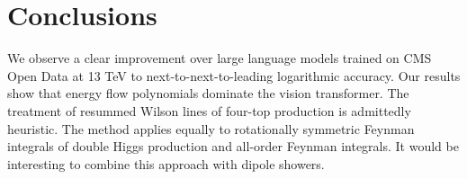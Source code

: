 \section{Conclusions}\label{sec:conclusions}

We observe a clear improvement over large language models trained on CMS
Open Data at 13 TeV to next-to-next-to-leading logarithmic accuracy. Our
results show that energy flow polynomials dominate the vision
transformer. The treatment of resummed Wilson lines of four-top
production is admittedly heuristic. The method applies equally to
rotationally symmetric Feynman integrals of double Higgs production and
all-order Feynman integrals. It would be interesting to combine this
approach with dipole showers.


